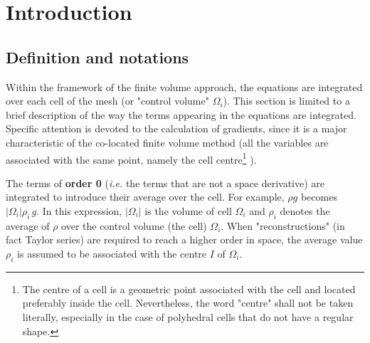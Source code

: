 
%
%
%
%


\section{Introduction}

\subsection{Definition and notations}

Within the framework of the finite volume approach, the equations are
integrated over each cell of the mesh (or "control volume" $\Omega_i$). 
This section is limited to a brief description of the way the terms appearing in
the equations are integrated. Specific attention is devoted to the
calculation of gradients, since it is a major characteristic of the
co-located finite volume method (all the variables are associated with the
same point, namely the cell centre\footnote{%
The centre of a cell is a geometric point associated with the cell and
located preferably inside the cell. Nevertheless, the word "centre" shall
not be taken literally,
especially in the case of polyhedral cells that do not have a regular shape.}%
).

The terms of \textbf{order 0} (\emph{i.e.} the terms that are not a space
derivative) are integrated to introduce their average over the cell. For
example, $\rho g$ becomes $|\Omega _{i}|\rho_{i}\,g$. 
In this expression, $|\Omega _{i}|$ is the volume of cell $\Omega _{i}$ and 
$\rho_{i}$ denotes the average of $\rho $ over the control volume
(the cell) $\Omega _{i}$. When
"reconstructions" (in fact Taylor series) are required to reach a higher
order in space, the average value $\rho_{i}$ is assumed to be associated
with the centre $I$ of $\Omega _{i}$.

